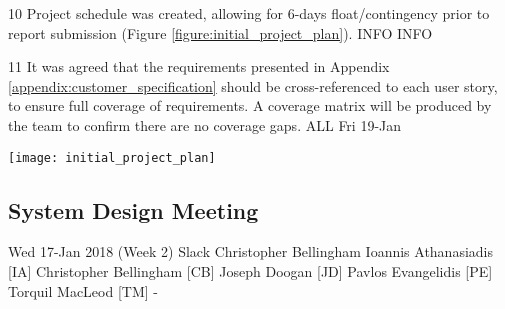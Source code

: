 \begin{momitems}
	\momitem
	{10}
	{Project schedule was created, allowing for 6-days float/contingency prior to report submission (Figure \ref{figure:initial_project_plan}).}
	{INFO}
	{INFO}

	\momitem
	{11}
	{It was agreed that the requirements presented in Appendix \ref{appendix:customer_specification} should be cross-referenced to each user story, to ensure full coverage of requirements. A coverage matrix will be produced by the team to confirm there are no coverage gaps.}
	{ALL}
	{Fri 19-Jan}
\end{momitems}

\begin{center}
	\texttt{[image: initial\_project\_plan]}
	\label{figure:initial_project_plan}
\end{center}

\newpage
\subsection{System Design Meeting}

\momtoptable
{Wed 17-Jan 2018 (Week 2)}
{Slack}
{Christopher Bellingham}
{Ioannis Athanasiadis [IA]\newline
Christopher Bellingham [CB]\newline
Joseph Doogan [JD]\newline
Pavlos Evangelidis [PE]\newline
Torquil MacLeod [TM]}
{-}

